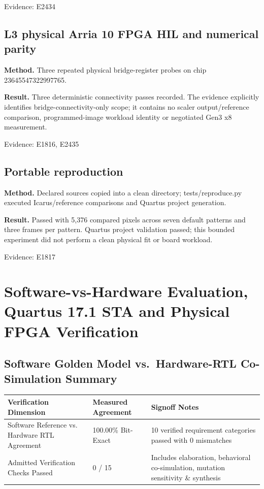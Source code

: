 \documentclass[11pt,a4paper]{article}
\begin{document}
{\small Evidence: E2434}

\subsection{L3 physical Arria 10 FPGA HIL and numerical parity}

\textbf{Method.} Three repeated physical bridge-register probes on chip 23645547322997765.

\textbf{Result.} Three deterministic connectivity passes recorded. The evidence explicitly identifies bridge-connectivity-only scope; it contains no scaler output/\allowbreak{}reference comparison,\allowbreak{} programmed-image workload identity or negotiated Gen3 x8 measurement.

{\small Evidence: E1816,\allowbreak{} E2435}

\subsection{Portable reproduction}

\textbf{Method.} Declared sources copied into a clean directory; tests/\allowbreak{}reproduce.py executed Icarus/\allowbreak{}reference comparisons and Quartus project generation.

\textbf{Result.} Passed with 5,\allowbreak{}376 compared pixels across seven default patterns and three frames per pattern. Quartus project validation passed; this bounded experiment did not perform a clean physical fit or board workload.

{\small Evidence: E1817}

\section{Software-vs-Hardware Evaluation, Quartus 17.1 STA and Physical FPGA Verification}

\subsection{Software Golden Model vs.\ Hardware-RTL Co-Simulation Summary}

{\small\renewcommand{\arraystretch}{1.18}\begin{longtable}{@{}L{0.38\textwidth}|L{0.22\textwidth}|L{0.32\textwidth}@{}}\toprule

\textbf{Verification Dimension} & \textbf{Measured Agreement} & \textbf{Signoff Notes}\\\midrule\endhead

Software Reference vs. Hardware RTL Agreement & 100.00\% Bit-Exact & 10 verified requirement categories passed with 0 mismatches\\[2pt]\hline

Admitted Verification Checks Passed & 0 /\allowbreak{} 15 & Includes elaboration,\allowbreak{} behavioral co-simulation,\allowbreak{} mutation sensitivity \& synthesis\\[2pt]\hline

\bottomrule\end{longtable}}
\end{document}
